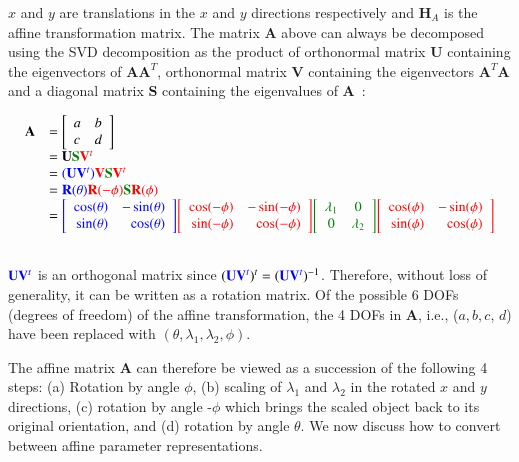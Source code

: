 $x$ and $y$ are translations in the $x$ and $y$ directions respectively and $\mathbf{H}_A$ is the affine transformation matrix.  The matrix $\mathbf{A}$ above can always be decomposed using the SVD decomposition as the product of orthonormal matrix $\mathbf{U}$ containing the eigenvectors of $\mathbf{A}\mathbf{A}^T$, orthonormal matrix $\mathbf{V}$ containing the eigenvectors  $\mathbf{A}^T\mathbf{A}$ and a diagonal matrix $\mathbf{S}$ containing the eigenvalues of $\mathbf{A}$~\cite{2004_BOOK_CG_Hartley}:

\begin{equation}
\begin{array}{llllllll}
\mathbf{A} &= \left[\begin{array}{lll}a & b \\ c & d\\ \end{array}\right] \\
&=\mathbf{U}{\color{darkgreen}\mathbf{S}}{\color{red}\mathbf{V}^t} \\
&={\color{blue}(\mathbf{U}\mathbf{V}^t)}{\color{red}\mathbf{V}}{\color{darkgreen}\mathbf{S}}{\color{red}\mathbf{V}^t}\\
&={\color{blue}\mathbf{R}(\theta)}{\color{red}\mathbf{R}(-\phi)}{\color{darkgreen}\mathbf{S}}{\color{red}\mathbf{R} (\phi)}\\
&={\color{blue}\RotMatrixTheta}{\color{red}\RotMatrixminusPhi}{\color{darkgreen}\EigenvalueMatrix}{\color{red}\RotMatrixPhi}\\\\
\end{array}
\label{Eq:AffineDecomposition}
\end{equation}

${\color{blue}\mathbf{U}\mathbf{V}^t}$ is an orthogonal matrix since $({\color{blue}\mathbf{U}\mathbf{V}^t})^t =({\color{blue}\mathbf{U}\mathbf{V}^t})^{-1}$.  Therefore, without loss of generality, it can be written as a rotation matrix.  Of the possible 6 DOFs (degrees of freedom) of the affine transformation, the 4 DOFs in $\mathbf{A}$, i.e., ($a, b, c$, $d$) have been replaced with $(\theta, \lambda_1, \lambda_2, \phi)$.

The affine matrix $\mathbf{A}$ can therefore be viewed as a succession of the following 4 steps: (a) Rotation by angle $\phi$, (b) scaling of $\lambda_1$ and $\lambda_2$ in the rotated $x$ and $y$ directions, (c) rotation by angle -$\phi$ which brings the scaled object back to its original orientation, and (d) rotation by angle $\theta$.  We now discuss how to convert between affine parameter representations.

